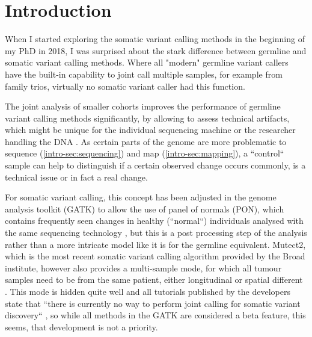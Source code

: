 \section{Introduction}
\label{variantcalling-sec:intro}

When I started exploring the somatic variant calling methods in the beginning of my PhD in 2018, I was surprised about the stark difference between germline and somatic variant calling methods. Where all "modern" germline variant callers have the built-in capability to joint call multiple samples, for example from family trios, virtually no somatic variant caller had this function. 

The joint analysis of smaller cohorts improves the performance of germline variant calling methods significantly, by allowing to assess technical artifacts, which might be unique for the individual sequencing machine or the researcher handling the DNA \cite{Schirmer2016,Stoler2021}. As certain parts of the genome are more problematic to sequence (\autoref{intro-sec:sequencing}) and map (\autoref{intro-sec:mapping}), a ``control`` sample can help to distinguish if a certain observed change occurs commonly, is a technical issue or in fact a real change.

For somatic variant calling, this concept has been adjusted in the genome analysis toolkit (GATK) \cite{BrianOConnor2020} to allow the use of panel of normals (PON), which contains frequently seen changes in healthy (``normal``) individuals analysed with the same sequencing technology \cite{GATKTeam2021}, but this is a post processing step of the analysis rather than a more intricate model like it is for the germline equivalent. Mutect2, which is the most recent somatic variant calling algorithm provided by the Broad institute, however also provides a multi-sample mode, for which all tumour samples need to be from the same patient, either longitudinal or spatial different \cite{GATKTeam2020}. This mode is hidden quite well and all tutorials published by the developers state that ``there is currently no way to perform joint calling for somatic variant discovery`` \cite{GATKTeam2021a}, so while all methods in the GATK are considered a beta feature, this seems, that development is not a priority.

